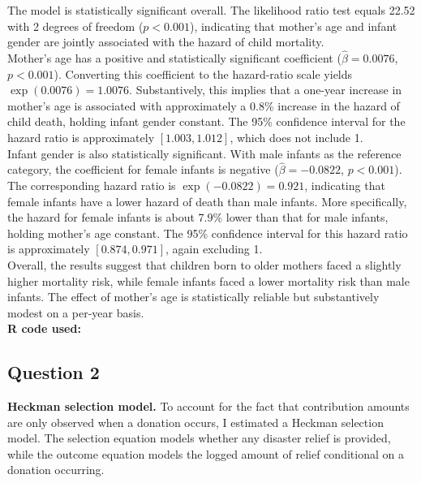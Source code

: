 \documentclass[12pt,letterpaper]{article}
\begin{document}
\noindent The model is statistically significant overall. The likelihood ratio test equals 22.52 with 2 degrees of freedom (\(p < 0.001\)), indicating that mother's age and infant gender are jointly associated with the hazard of child mortality.\\

\noindent Mother's age has a positive and statistically significant coefficient (\(\hat{\beta} = 0.0076\), \(p < 0.001\)). Converting this coefficient to the hazard-ratio scale yields \(\exp(0.0076) = 1.0076\). Substantively, this implies that a one-year increase in mother's age is associated with approximately a 0.8\% increase in the hazard of child death, holding infant gender constant. The 95\% confidence interval for the hazard ratio is approximately \([1.003, 1.012]\), which does not include 1.\\

\noindent Infant gender is also statistically significant. With male infants as the reference category, the coefficient for female infants is negative (\(\hat{\beta} = -0.0822\), \(p < 0.001\)). The corresponding hazard ratio is \(\exp(-0.0822) = 0.921\), indicating that female infants have a lower hazard of death than male infants. More specifically, the hazard for female infants is about 7.9\% lower than that for male infants, holding mother's age constant. The 95\% confidence interval for this hazard ratio is approximately \([0.874, 0.971]\), again excluding 1.\\

\noindent Overall, the results suggest that children born to older mothers faced a slightly higher mortality risk, while female infants faced a lower mortality risk than male infants. The effect of mother's age is statistically reliable but substantively modest on a per-year basis.\\

\noindent \textbf{R code used:}


\newpage

\subsection*{Question 2}

\noindent \textbf{Heckman selection model.}
To account for the fact that contribution amounts are only observed when a donation occurs, I estimated a Heckman selection model. The selection equation models whether any disaster relief is provided, while the outcome equation models the logged amount of relief conditional on a donation occurring.\\
\end{document}
